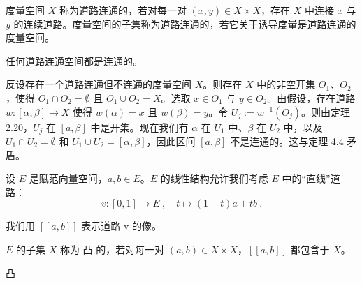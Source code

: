 度量空间 $X$ 称为道路连通的，若对每一对 $(x, y) \in X \times X$，存在 $X$ 中连接 $x$ 与 $y$ 的连续道路。度量空间的子集称为道路连通的，若它关于诱导度量是道路连通的度量空间。


\begin{proposition}

任何道路连通空间都是连通的。

\proofhead
反设存在一个道路连通但不连通的度量空间 $X$。则存在 $X$ 中的非空开集 $O_1$、$O_2$，使得 $O_1 \cap O_2 = \emptyset$ 且 $O_1 \cup O_2 = X$。选取 $x \in O_1$ 与 $y \in O_2$。由假设，存在道路 $w: [\alpha, \beta] \to X$ 使得 $w(\alpha) = x$ 且 $w(\beta) = y$。令 $U_j := w^{-1}(O_j)$。则由定理 2.20，$U_j$ 在 $[a, \beta]$ 中是开集。现在我们有 $\alpha$ 在 $U_1$ 中、$\beta$ 在 $U_2$ 中，以及 $U_1 \cap U_2 = \emptyset$ 和 $U_1 \cup U_2 = [\alpha, \beta]$，因此区间 $[a, \beta]$ 不是连通的。这与定理 4.4 矛盾。

设 $E$ 是赋范向量空间，$a, b \in E$。$E$ 的线性结构允许我们考虑 $E$ 中的“直线”道路：
\begin{equation}
v:[0,1]\to E~,\quad t\mapsto(1-t)a+t b~.
\end{equation}

我们用 $\left[\!\!\left[a, b\right]\!\!\right]$ 表示道路 v 的像。

$E$ 的子集 $X$ 称为 $\mathbf{凸}$ 的，若对每一对 $(a,b)\in X\times X$，$\left[\!\!\left[a,b\right]\!\!\right]$ 都包含于 $X$。


凸

\end{proposition}

